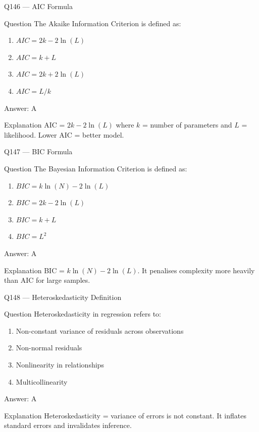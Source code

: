 \documentclass[aspectratio=169,8pt]{beamer}
\begin{document}
	\begin{frame}{Q146 --- AIC Formula}
		\begin{block}{Question}
			The Akaike Information Criterion is defined as:
			\begin{enumerate}
				\item $AIC = 2k - 2\ln(L)$
				\item $AIC = k + L$
				\item $AIC = 2k + 2\ln(L)$
				\item $AIC = L/k$
			\end{enumerate}
		\end{block}
		\begin{exampleblock}{Answer: A}\end{exampleblock}
		\begin{block}{Explanation}
			AIC = $2k - 2\ln(L)$ where $k$ = number of parameters and $L$ = likelihood. Lower AIC = better model.
		\end{block}
	\end{frame}
	
	\begin{frame}{Q147 --- BIC Formula}
		\begin{block}{Question}
			The Bayesian Information Criterion is defined as:
			\begin{enumerate}
				\item $BIC = k\ln(N) - 2\ln(L)$
				\item $BIC = 2k - 2\ln(L)$
				\item $BIC = k + L$
				\item $BIC = L^2$
			\end{enumerate}
		\end{block}
		\begin{exampleblock}{Answer: A}\end{exampleblock}
		\begin{block}{Explanation}
			BIC = $k\ln(N) - 2\ln(L)$. It penalises complexity more heavily than AIC for large samples.
		\end{block}
	\end{frame}
	
	\begin{frame}{Q148 --- Heteroskedasticity Definition}
		\begin{block}{Question}
			Heteroskedasticity in regression refers to:
			\begin{enumerate}
				\item Non-constant variance of residuals across observations
				\item Non-normal residuals
				\item Nonlinearity in relationships
				\item Multicollinearity
			\end{enumerate}
		\end{block}
		\begin{exampleblock}{Answer: A}\end{exampleblock}
		\begin{block}{Explanation}
			Heteroskedasticity = variance of errors is not constant. It inflates standard errors and invalidates inference.
		\end{block}
	\end{frame}
	
\end{document}
